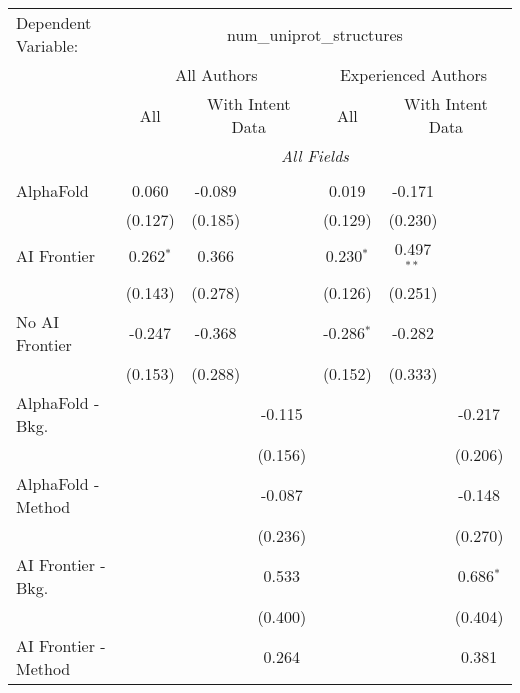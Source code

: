 \begingroup
\centering
\begin{tabular}{lcccccc}
   \tabularnewline \midrule \midrule
   Dependent Variable: & \multicolumn{6}{c}{num\_uniprot\_structures}\\
 & \multicolumn{3}{c}{All Authors} & \multicolumn{3}{c}{Experienced Authors} \\
\cmidrule(lr){2-4} \cmidrule(lr){5-7}
 & \multicolumn{1}{c}{All} & \multicolumn{2}{c}{With Intent Data} & \multicolumn{1}{c}{All} & \multicolumn{2}{c}{With Intent Data} \\
\cmidrule(lr){2-2} \cmidrule(lr){3-4} \cmidrule(lr){5-5} \cmidrule(lr){6-7}
 & \multicolumn{6}{c}{\textit{All Fields}} \\ \\
   AlphaFold               & 0.060       & -0.089  &         & 0.019        & -0.171       &   \\   
                           & (0.127)     & (0.185) &         & (0.129)      & (0.230)      &   \\   
   AI Frontier             & 0.262$^{*}$ & 0.366   &         & 0.230$^{*}$  & 0.497$^{**}$ &   \\   
                           & (0.143)     & (0.278) &         & (0.126)      & (0.251)      &   \\   
   No AI Frontier          & -0.247      & -0.368  &         & -0.286$^{*}$ & -0.282       &   \\   
                           & (0.153)     & (0.288) &         & (0.152)      & (0.333)      &   \\   
   AlphaFold - Bkg.        &             &         & -0.115  &              &              & -0.217\\   
                           &             &         & (0.156) &              &              & (0.206)\\   
   AlphaFold - Method      &             &         & -0.087  &              &              & -0.148\\   
                           &             &         & (0.236) &              &              & (0.270)\\   
   AI Frontier - Bkg.      &             &         & 0.533   &              &              & 0.686$^{*}$\\   
                           &             &         & (0.400) &              &              & (0.404)\\   
   AI Frontier - Method    &             &         & 0.264   &              &              & 0.381\\   

\end{tabular}
